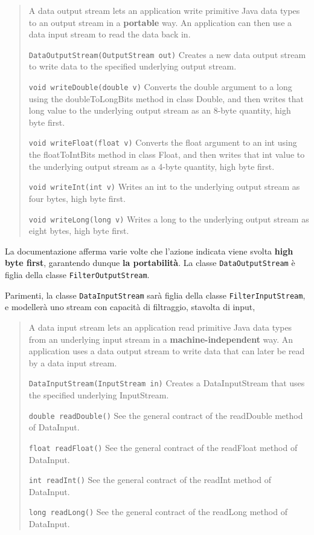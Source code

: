 \documentclass[\fontsizeclass,twocolumn]{\classname}
\theoremstyle{definition}
\theoremstyle{definition}
\begin{document}
\begin{quote}
    \footnotesize{A data output stream lets an application write primitive Java data types to an output stream in a \textbf{portable} way. An application can then use a data input stream to read the data back in.

        \texttt{DataOutputStream(OutputStream out)} 	Creates a new data
        output stream to write data to the specified underlying output stream.

        \texttt{void 	writeDouble(double v)} 	Converts the double argument to a long using the doubleToLongBits method in class Double, and then writes that long value to the underlying output stream as an 8-byte quantity, high byte first.

        \texttt{void 	writeFloat(float v)} 	Converts the float argument to an int using the floatToIntBits method in class Float, and then writes that int value to the underlying output stream as a 4-byte quantity, high byte first.

        \texttt{void 	writeInt(int v)} 	Writes an int to the underlying output stream as four bytes, high byte first.

        \texttt{void 	writeLong(long v)} 	Writes a long to the underlying output stream as eight bytes, high byte first.
    }
\end{quote}

La documentazione afferma varie volte che l'azione indicata viene svolta
\textbf{high byte first}, garantendo dunque \textbf{la portabilità}. La classe
\texttt{DataOutputStream} è figlia della classe \texttt{FilterOutputStream}.

Parimenti, la classe \texttt{DataInputStream} sarà figlia della classe
\texttt{FilterInputStream}, e modellerà uno stream con capacità di filtraggio,
stavolta di input,

\begin{quote}
    \footnotesize{A data input stream lets an application read primitive Java data types from an underlying input stream in a \textbf{machine-independent} way. An application uses a data output stream to write data that can later be read by a data input stream.

    \texttt{DataInputStream(InputStream in)} 	Creates a DataInputStream that uses the specified underlying InputStream.

    \texttt{double 	readDouble()} 	See the general contract of the readDouble method of DataInput.

    \texttt{float 	readFloat()} 	See the general contract of the readFloat method of DataInput.

    \texttt{int 	readInt()} 	See the general contract of the readInt method of DataInput.

    \texttt{long 	readLong()} 	See the general contract of the readLong method of DataInput.
    }
\end{quote}
\end{document}
